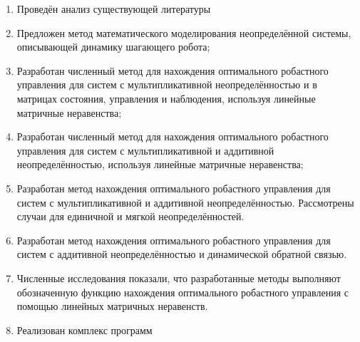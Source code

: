 \begin{enumerate}
  \item Проведён анализ существующей литературы 
  \item Предложен метод математического моделирования неопределённой системы, описывающей динамику шагающего робота;
  \item Разработан численный метод для нахождения оптимального робастного управления для систем с мультипликативной неопределённостью и в матрицах состояния, управления и наблюдения, используя линейные матричные неравенства;
  \item Разработан численный метод для нахождения оптимального робастного управления для систем с мультипликативной и аддитивной неопределённостью, используя линейные матричные неравенства;
  \item Разработан метод нахождения оптимального робастного управления для систем с мультипликативной и аддитивной неопределённостью. Рассмотрены случаи для единичной и мягкой неопределённостей.
  \item Разработан метод нахождения оптимального робастного управления для систем с аддитивной неопределённостью и динамической обратной связью.
  \item Численные исследования показали, что разработанные методы выполняют обозначенную функцию нахождения оптимального робастного управления с помощью линейных матричных неравенств.
  \item Реализован комплекс программ
\end{enumerate}
